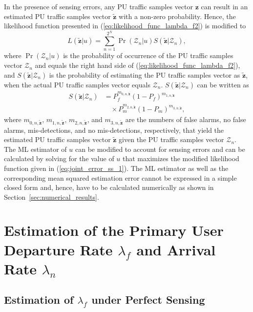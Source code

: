 \documentclass[11pt,draftclsnofoot,journal,onecolumn]{IEEEtran}
\begin{document}
In the presence of sensing errors, any PU traffic samples vector $\boldsymbol{z}$ can result in an estimated PU traffic samples vector $\boldsymbol{\tilde z}$ with a non-zero probability. Hence, the likelihood function presented in (\ref{eq:likelihood_func_lambda_f2}) is modified to
\begin{equation}
L(\boldsymbol{\tilde z}|u) = \sum_{n=1}^{2^N} \Pr(\mathcal{Z}_n|u) S(\boldsymbol{\tilde z}|\mathcal{Z}_n),
\label{eq;joint_error_ss_1}
\end{equation}
where $\Pr(\mathcal{Z}_n|u)$ is the probability of occurrence of the PU traffic samples vector $\mathcal{Z}_n$ and equals the right hand side of (\ref{eq:likelihood_func_lambda_f2}), and $S(\boldsymbol{\tilde z}|\mathcal{Z}_n)$ is the probability of estimating the PU traffic samples vector as $\boldsymbol{\tilde z}$, when the actual PU traffic samples vector equals $\mathcal{Z}_n$. $S(\boldsymbol{\tilde z}|\mathcal{Z}_n)$ can be written as
\begin{align}
S(\boldsymbol{\tilde z}|\mathcal{Z}_n) & = P_{f}^{m_{0,n,\boldsymbol{\tilde z}}} (1 - P_{f})^{m_{1,n,\boldsymbol{\tilde z}}} \nonumber\\&\quad\times P_{m}^{m_{2,n,\boldsymbol{\tilde z}}} (1 - P_{m})^{m_{3,n,\boldsymbol{\tilde z}}},
\label{eq;joint_error_ss_2}
\end{align}
where $m_{0,n,\boldsymbol{\tilde z}}$, $m_{1,n,\boldsymbol{\tilde z}}$, $m_{2,n,\boldsymbol{\tilde z}}$, and $m_{3,n,\boldsymbol{\tilde z}}$ are the numbers of false alarms, no false alarms, mis-detections, and no mis-detections, respectively, that yield the estimated PU traffic samples vector $\boldsymbol{\tilde z}$ given the PU traffic samples vector $\mathcal{Z}_n$. The ML estimator of $u$ can be modified to account for sensing errors and can be calculated by solving for the value of $u$ that maximizes the modified likelihood function given in (\ref{eq;joint_error_ss_1}). The ML estimator as well as the corresponding mean squared estimation error cannot be expressed in a simple closed form and, hence, have to be calculated numerically as shown in Section~\ref{sec:numerical_results}.

\section{Estimation of the Primary User Departure Rate $\lambda_{f}$ and Arrival Rate $\lambda_{n}$}
\label{sec:lambda_f_estimation}

\subsection{Estimation of $\lambda_{f}$ under Perfect Sensing}
\label{sec:lambda_f_estimation_ML}
\end{document}
